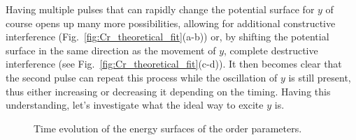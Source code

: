 Having multiple pulses that can rapidly change the potential surface for $y$ of course opens up many more possibilities, allowing for additional constructive interference (Fig.~\ref{fig:Cr_theoretical_fit}(a-b)) or, by shifting the potential surface in the same direction as the movement of $y$, complete destructive interference (see Fig.~\ref{fig:Cr_theoretical_fit}(c-d)).
It then becomes clear that the second pulse can repeat this process while the oscillation of $y$ is still present, thus either increasing or decreasing it depending on the timing.
Having this understanding, let's investigate what the ideal way to excite $y$ is. 


\begin{figure}
	\begin{subfigure}{0.5\textwidth}
	\end{subfigure}
	\begin{subfigure}{0.5\textwidth}
	\end{subfigure}
	\caption{\label{fig:Cr_energy_surfaces} Time evolution of the energy surfaces of the order parameters.}
\end{figure}

